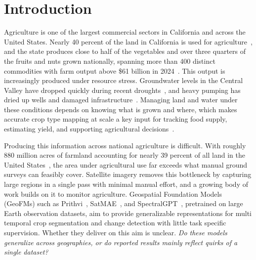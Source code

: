 \documentclass[sigconf]{acmart}
\begin{document}


\maketitle


\section{Introduction}
Agriculture is one of the largest commercial sectors in California and across the United States. Nearly 40 percent of the land in California is used for agriculture~\cite{ppic2024landuse}, and the state produces close to half of the vegetables and over three quarters of the fruits and nuts grown nationally, spanning more than 400 distinct commodities with farm output above \$61 billion in 2024~\cite{cdfa2024statistics}. This output is increasingly produced under resource stress. Groundwater levels in the Central Valley have dropped quickly during recent droughts~\cite{liu2022groundwater}, and heavy pumping has dried up wells and damaged infrastructure~\cite{ppic2024drought}. Managing land and water under these conditions depends on knowing what is grown and where, which makes accurate crop type mapping at scale a key input for tracking food supply, estimating yield, and supporting agricultural decisions~\cite{joshi2025cropmapping}.

Producing this information across national agriculture is difficult. With roughly 880 million acres of farmland accounting for nearly 39 percent of all land in the United States~\cite{usda2022census}, the area under agricultural use far exceeds what manual ground surveys can feasibly cover. Satellite imagery removes this bottleneck by capturing large regions in a single pass with minimal manual effort, and a growing body of work builds on it to monitor agriculture. Geospatial Foundation Models (GeoFMs) such as Prithvi~\cite{jakubik2023foundation}, SatMAE~\cite{cong2022satmae}, and SpectralGPT~\cite{hong2024spectralgpt}, pretrained on large Earth observation datasets, aim to provide generalizable representations for multi temporal crop segmentation and change detection with little task specific supervision. Whether they deliver on this aim is unclear. \textit{Do these models generalize across geographies, or do reported results mainly reflect quirks of a single dataset?}
\end{document}
